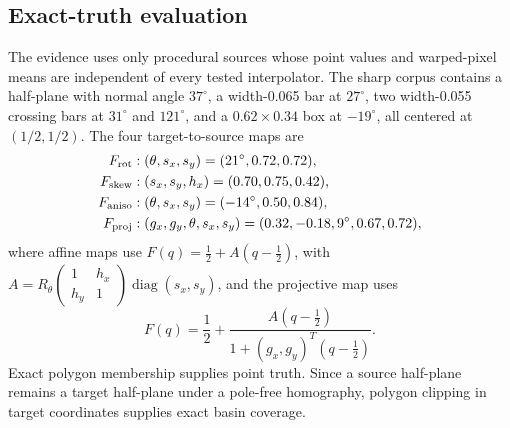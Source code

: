 \subsection{Exact-truth evaluation}

The evidence uses only procedural sources whose point values and warped-pixel
means are independent of every tested interpolator.  The sharp corpus
contains a half-plane with normal angle \(37^\circ\), a width-0.065 bar at
\(27^\circ\), two width-0.055 crossing bars at \(31^\circ\) and
\(121^\circ\), and a \(0.62\times0.34\) box at \(-19^\circ\), all centered
at \((1/2,1/2)\).  The four target-to-source maps are
\begin{align}
 F_{\rm rot}&: (\theta,s_x,s_y)=(21^\circ,0.72,0.72),\nonumber\\
 F_{\rm skew}&: (s_x,s_y,h_x)=(0.70,0.75,0.42),\nonumber\\
 F_{\rm aniso}&: (\theta,s_x,s_y)=(-14^\circ,0.50,0.84),\nonumber\\
 F_{\rm proj}&: (g_x,g_y,\theta,s_x,s_y)
 =(0.32,-0.18,9^\circ,0.67,0.72),
 \label{eq:warpcorpusmaps}
\end{align}
where affine maps use \(F(q)=\tfrac12+A(q-\tfrac12)\), with
\(A=R_\theta\left(\begin{smallmatrix}1&h_x\\h_y&1\end{smallmatrix}\right)
\operatorname{diag}(s_x,s_y)\), and the projective map uses
\begin{equation}
 F(q)=\frac12+
 \frac{A(q-\frac12)}{1+(g_x,g_y)^T(q-\frac12)}.
 \label{eq:warpprojectivedeclared}
\end{equation}
Exact polygon membership supplies point truth.  Since a source half-plane
remains a target half-plane under a pole-free homography, polygon clipping in
target coordinates supplies exact basin coverage.

